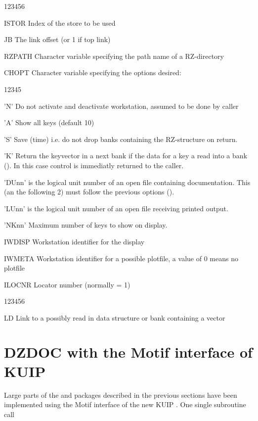\Idesc
 
\begin{DLtt}{123456}
\item[ISTOR]  Index of the store to be used
\item[JB]     The link offset (or 1 if top link)
\item[RZPATH] Character variable specifying the path name of a RZ-directory
\item[CHOPT]  Character variable specifying the options desired:
  \begin{DLtt}{12345}
    \item['N']    Do not activate and deactivate workstation,
                  assumed to be done by caller
    \item['A']    Show all keys (default 10)
    \item['S']    Save (time) i.e. do not drop banks containing
                  the RZ-structure on return.
    \item['K']    Return the keyvector in a next bank if the data for
                  a key a read into a bank (). 
                  In this case control is immediatly returned to the caller.
    \item['DUnn']  is the logical unit number of an open file
                  containing documentation. This (an the following 2)
                  must follow the previous options ().
    \item['LUnn']  is the logical unit number of an open file
                  receiving printed output.
    \item['NKnn'] Maximum number of keys to show on display.
  \end{DLtt}
\item[IWDISP] Workstation identifier for the display
\item[IWMETA] Workstation identifier for a possible plotfile,
              a value of 0 means no plotfile
\item[ILOCNR] Locator number (normally = 1)
\end{DLtt}
 
\Odesc
 
\begin{DLtt}{123456}
\item[LD]  Link to a possibly read in data structure or bank containing a vector
\end{DLtt}
 
\section{DZDOC with the Motif interface of KUIP}
Large parts of the  and  packages
described in the previous
sections have been implemented using the Motif 
interface of the new KUIP \cite{bib-KUIP}. One single subroutine call
 
